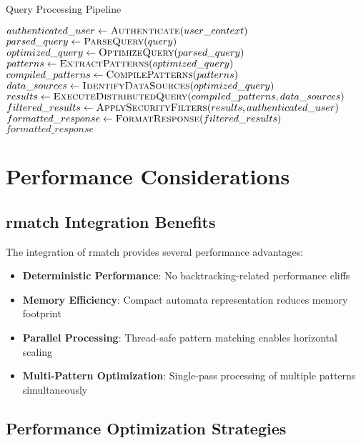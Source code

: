 \documentclass[11pt,a4paper]{article}
\begin{document}
\begin{algorithm}
\caption{Query Processing Pipeline}
\begin{algorithmic}[1]
    \State $authenticated\_user \gets \Call{Authenticate}{user\_context}$
    \State $parsed\_query \gets \Call{ParseQuery}{query}$
    \State $optimized\_query \gets \Call{OptimizeQuery}{parsed\_query}$
    \State $patterns \gets \Call{ExtractPatterns}{optimized\_query}$
    \State $compiled\_patterns \gets \Call{CompilePatterns}{patterns}$ 
    \State $data\_sources \gets \Call{IdentifyDataSources}{optimized\_query}$
    \State $results \gets \Call{ExecuteDistributedQuery}{compiled\_patterns, data\_sources}$
    \State $filtered\_results \gets \Call{ApplySecurityFilters}{results, authenticated\_user}$
    \State $formatted\_response \gets \Call{FormatResponse}{filtered\_results}$
    \State \Return $formatted\_response$
\EndProcedure
\end{algorithmic}
\end{algorithm}

\section{Performance Considerations}

\subsection{rmatch Integration Benefits}

The integration of rmatch provides several performance advantages:

\begin{itemize}
\item \textbf{Deterministic Performance}: No backtracking-related performance cliffs
\item \textbf{Memory Efficiency}: Compact automata representation reduces memory footprint
\item \textbf{Parallel Processing}: Thread-safe pattern matching enables horizontal scaling
\item \textbf{Multi-Pattern Optimization}: Single-pass processing of multiple patterns simultaneously
\end{itemize}

\subsection{Performance Optimization Strategies}
\end{document}
